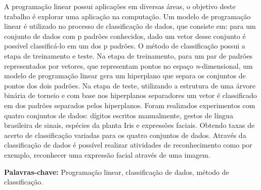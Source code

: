 \begin{resumo}
A programação linear possui aplicações em diversas áreas, o objetivo deste trabalho é explorar uma aplicação na computação. Um modelo de programação linear é utilizado no processo de classificação de dados, que consiste em: para um conjunto de dados com p padrões conhecidos, dado um vetor desse conjunto é possível classificá-lo em um dos p padrões. O método de classificação possui a etapa de treinamento e teste. Na etapa de treinamento, para um par de padrões representados por vetores, que representam pontos no espaço \textit{n}-dimensional, um modelo de programação linear gera um hiperplano que separa os conjuntos de pontos dos dois padrões. Na etapa de teste, utilizando a estrutura de uma árvore binária de torneio e com base nos hiperplanos separadores um vetor é classificado em dos padrões separados pelos hiperplanos. Foram realizados experimentos com quatro conjuntos de dados: dígitos escritos manualmente, gestos de língua brasileira de sinais, espécies da planta Iris e expressões faciais. Obtendo taxas de acerto de classificação variadas para os quatro conjuntos de dados. Através da classificação de dados é possível realizar atividades de reconhecimento como por exemplo, reconhecer uma expressão facial através de uma imagem.

\textbf{Palavras-chave:} Programação linear, classificação de dados, método de classificação.
\end{resumo}
